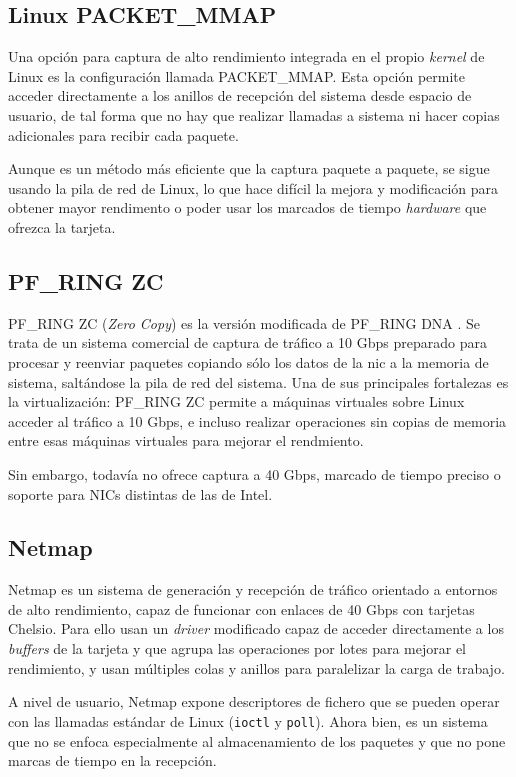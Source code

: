 \documentclass[twoside, 12pt, draft]{epstfg}
\begin{document}
\subsection{Linux PACKET\_MMAP}

Una opción para captura de alto rendimiento integrada en el propio \textit{kernel} de Linux es la configuración llamada PACKET\_MMAP. Esta opción permite acceder directamente a los anillos de recepción del sistema desde espacio de usuario, de tal forma que no hay que realizar llamadas a sistema ni hacer copias adicionales para recibir cada paquete.

Aunque es un método más eficiente que la captura paquete a paquete, se sigue usando la pila de red de Linux, lo que hace difícil la mejora y modificación para obtener mayor rendimento o poder usar los marcados de tiempo \textit{hardware} que ofrezca la tarjeta.

\subsection{PF\_RING ZC}

PF\_RING ZC (\textit{Zero Copy}) es la versión modificada de PF\_RING DNA \cite{rizzo201210}. Se trata de un sistema comercial de captura de tráfico a 10 Gbps preparado para procesar y reenviar paquetes copiando sólo los datos de la \gls{nic} a la memoria de sistema, saltándose la pila de red del sistema. Una de sus principales fortalezas es la virtualización: PF\_RING ZC permite a máquinas virtuales sobre Linux acceder al tráfico a 10 Gbps, e incluso realizar operaciones sin copias de memoria entre esas máquinas virtuales para mejorar el rendmiento.

Sin embargo, todavía no ofrece captura a 40 Gbps, marcado de tiempo preciso o soporte para NICs distintas de las de Intel.

\subsection{Netmap}

Netmap es un sistema de generación y recepción de tráfico orientado a entornos de alto rendimiento, capaz de funcionar con enlaces de 40 Gbps con tarjetas Chelsio. Para ello usan un \textit{driver} modificado capaz de acceder directamente a los \textit{buffers} de la tarjeta y que agrupa las operaciones por lotes para mejorar el rendimiento, y usan múltiples colas y anillos para paralelizar la carga de trabajo.

A nivel de usuario, Netmap expone descriptores de fichero que se pueden operar con las llamadas estándar de Linux (\texttt{ioctl} y \texttt{poll}). Ahora bien, es un sistema que no se enfoca especialmente al almacenamiento de los paquetes y que no pone marcas de tiempo en la recepción.
\end{document}
